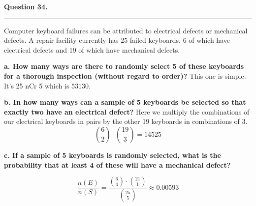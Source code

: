 \textbf{Question 34.} \\
\hrule 

Computer keyboard failures can be attributed to electrical defects or mechanical defects. A repair facility currently has 25 failed keyboards, 6 of which have electrical defects and 19 of which have mechanical defects.

\textbf{a. How many ways are there to randomly select 5 of these keyboards for a thorough inspection (without regard to order)?} \newline
This one is simple. It's 25 nCr 5 which is $\boxed{53130}$.

\textbf{b. In how many ways can a sample of 5 keyboards be selected so that exactly two have an electrical defect?} \newline
Here we multiply the combinations of our electrical keyboards in pairs by the other 19 keyboards in combinations of 3. 
\[\binom{6}{2} \cdot \binom{19}{3} = \boxed{14525}\]

\textbf{c. If a sample of 5 keyboards is randomly selected, what is the probability that at least 4 of these will have a mechanical defect?} 

\[\frac{n(E)}{n(S)} = \frac{\binom{6}{4} \cdot \binom{21}{1}}{\binom{25}{5}} \approx \boxed{0.00593}\]